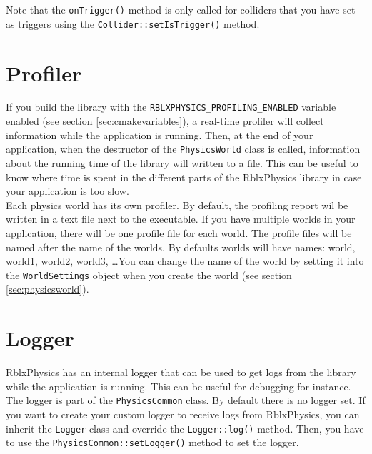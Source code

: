 \documentclass[a4paper,12pt]{article}
\begin{document}
    Note that the \texttt{onTrigger()} method is only called for colliders that you have set as triggers using the \texttt{Collider::setIsTrigger()} method.

    \section{Profiler}
    \label{sec:profiler}

    If you build the library with the \texttt{RBLXPHYSICS\_PROFILING\_ENABLED} variable enabled (see section \ref{sec:cmakevariables}), a real-time profiler
    will collect information while the application is running. Then, at the end of your application, when the destructor of the \texttt{PhysicsWorld}
    class is called, information about the running time of the library will written to a file.
    This can be useful to know where time is spent in the different parts of the RblxPhysics library in case your application is too slow. \\

    Each physics world has its own profiler. By default, the profiling report wil be written in a text file next to the executable.
    If you have multiple worlds in your application, there will be one profile file for each world. The profile files will be named after the
    name of the worlds. By defaults worlds will have names: world, world1, world2, world3, \dots You can change the name of the world by
    setting it into the \texttt{WorldSettings} object when you create the world (see section \ref{sec:physicsworld}). \\

    \section{Logger}
    \label{sec:logger}

    RblxPhysics has an internal logger that can be used to get logs from the library while the application is running. This can be useful for
    debugging for instance. \\

    The logger is part of the \texttt{PhysicsCommon} class. By default there is no logger set. If you want to create your custom logger to receive logs
    from RblxPhysics, you can inherit the \texttt{Logger} class and override the \texttt{Logger::log()} method. Then, you have to use the
    \texttt{PhysicsCommon::setLogger()} method to set the logger. \\
\end{document}
